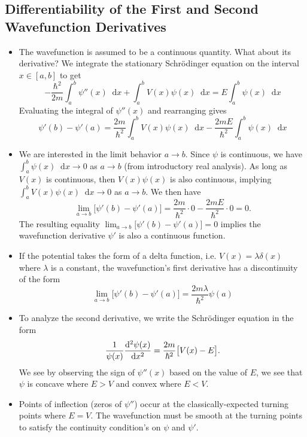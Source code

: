 \documentclass[11pt, a4paper]{article}
\newcommand{\diff}{\mathop{}\!\mathrm{d}} %
\newcommand{\Schro}{Schr\"{o}dinger\xspace}
\newcommand{\p}{\psi}  %
\begin{document}
\subsection{Differentiability of the First and Second Wavefunction Derivatives}
\begin{itemize}
	\item The wavefunction is assumed to be a continuous quantity. What about its derivative? We integrate the stationary \Schro equation on the interval $ x \in [a, b] $ to get
	\begin{equation*}
		-\frac{\hbar^{2}}{2m}\int_{a}^{b}\p''(x) \diff x + \int_{a}^{b}V(x)\p(x)\diff x = E \int_{a}^{b}\p (x) \diff x
	\end{equation*}
	Evaluating the integral of $ \psi''(x) $ and rearranging gives
	\begin{equation*}
		\psi'(b) - \psi'(a) = \frac{2m}{\hbar^{2}}\int_{a}^{b}V(x) \p(x) \diff x - \frac{2mE}{\hbar^{2}}\int_{a}^{b}\p(x)\diff x
	\end{equation*}
	
	\item We are interested in the limit behavior $ a \to b $. Since $ \p $ is continuous, we have $ \int_{a}^{b}\p(x)\diff x \to 0 $ as $ a \to b $ (from introductory real analysis). As long as $ V(x) $ is continuous, then $ V(x)\p(x) $ is also continuous, implying $ \int_{a}^{b}V(x)\p(x)\diff x \to 0 $ as $ a \to b $. We then have
	\begin{equation*}
		\lim_{a \to b} \big[\psi'(b) - \psi'(a)\big] = \frac{2m}{\hbar^{2}} \cdot 0 - \frac{2mE}{\hbar^{2}} \cdot 0 = 0.
	\end{equation*}
	The resulting equality $ \lim_{a \to b} \big[\psi'(b) - \psi'(a)\big] = 0 $ implies the wavefunction derivative $ \psi' $ is also a continuous function.
	
	\item If the potential takes the form of a delta function, i.e. $ V(x) = \lambda \delta (x) $ where $ \lambda $ is a constant, the wavefunction's first  derivative has a discontinuity of the form
	\begin{equation*}
		\lim_{a \to b} \big[\psi'(b) - \psi'(a)\big] = \frac{2m\lambda}{\hbar^{2}}\psi(a)
	\end{equation*}
	
	\item To analyze the second derivative, we write the \Schro equation in the form
	\begin{equation*}
		\frac{1}{\psi(x)} \dv[2]{\p(x)}{x} = \frac{2m}{\hbar^{2}}\big[V(x) - E\big].
	\end{equation*}
	We see by observing the sign of $ \psi''(x) $ based on the value of $ E $, we see that $ \p $ is concave where $ E > V $ and convex where $ E < V $. 
	
	\item Points of inflection (zeros of $ \psi'' $) occur at the classically-expected turning points where $ E = V $. The wavefunction must be smooth at the turning points to satisfy the continuity condition's on $ \p $ and $ \p' $. 
\end{itemize}
\end{document}

